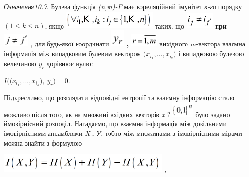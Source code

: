 \documentclass[a4paper]{article}
\newcounter{}
\begin{document}
 \textit{Означення10.7.}\textit{ }Булева функція
\textit{(}\textit{n}\textit{,}\textit{m}\textit{)-}\textit{F}  має кореляційний
імунітет  \textit{к-го }порядку  ${(1\le k\le n)}$, якщо 
\includegraphics[width=1.8598in,height=0.3634in]{crypt-img/crypt-img209.png} 
таких, що 
\includegraphics[width=0.5689in,height=0.3272in]{crypt-img/crypt-img210.png} 
\textbf{при }
\includegraphics[width=0.528in,height=0.2701in]{crypt-img/crypt-img211.png} ,
для будь-якої  координати 
\includegraphics[width=0.2898in,height=0.348in]{crypt-img/crypt-img212.png}
\textbf{, }
\includegraphics[width=0.5583in,height=0.2736in]{crypt-img/crypt-img213.png} 
вихідного \textit{m}{}-вектора  взаємна інформація між випадковим булевим 
вектором  ${(x_{{i_{{1}}}},\text{.}\text{.}\text{.},x_{i_{{k}}}{)}}$ і
випадковою булевою величиною  ${y_{{r}}}$ дорівнює нулю:

{\centering
 ${I((x_{{i_{{1}}}},\text{.}\text{.}\text{.},x_{i_{{k}}}{),\;y_{r}}{)=0}}$.
\par}

Підкреслимо, що розглядати відповідні ентропії та взаємну інформацію стало
можливо після того, як на множині  вхідних векторів \textit{x} ${?}$
\includegraphics[width=0.4437in,height=0.3193in]{crypt-img/crypt-img214.png} 
було задано ймовірнісний розподіл. Нагадаємо, що взаємна інформація  між
довільними імовірнісними  ансамблями \textit{X }і \textit{У}, тобто між
множинами з імовірнісними мірами можна знайти з формулою

{\centering\itshape
 \includegraphics[width=3.402in,height=0.3744in]{crypt-img/crypt-img215.png} , 
\par}
\end{document}
